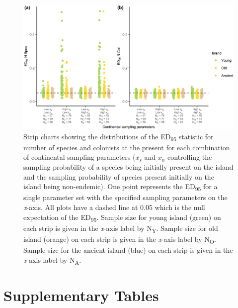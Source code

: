 \begin{figure}
    \centering
    \includegraphics{continental_spec_col_facet_.png}
    \caption{Strip charts showing the distributions of the ED\textsubscript{95} statistic for number of species and colonists at the present for each combination of continental sampling parameters ($x_s$ and $x_n$ controlling the sampling probability of a species being initially present on the island and the sampling probability of species present initially on the island being non-endemic). One point represents the ED\textsubscript{95} for a single parameter set with the specified sampling parameters on the \textit{x}-axis. All plots have a dashed line at 0.05 which is the null expectation of the ED\textsubscript{95}. Sample size for young island (green) on each strip is given in the \textit{x}-axis label by N\textsubscript{Y}. Sample size for old island (orange) on each strip is given in the \textit{x}-axis label by N\textsubscript{O}. Sample size for the ancient island (blue) on each strip is given in the \textit{x}-axis label by N\textsubscript{A}.}
    \label{fig:continental_spec_col_facet_}
\end{figure}

\clearpage

\section*{Supplementary Tables}

